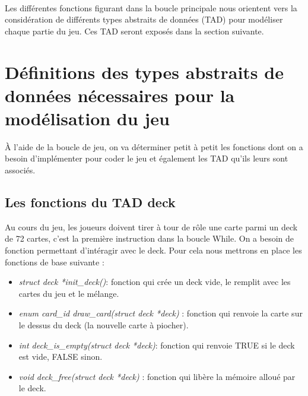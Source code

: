 \documentclass[12pt]{article}
\begin{document}
\paragraph{}Les différentes fonctions figurant dans la boucle principale nous orientent vers la considération de différents types abstraits de données (TAD) pour modéliser chaque partie du jeu. Ces TAD seront exposés dans la section suivante.

\section{Définitions des types abstraits de données nécessaires pour la modélisation du jeu}

À l'aide de la boucle de jeu, on va déterminer petit à petit les fonctions dont on a besoin d'implémenter pour coder le jeu et également les TAD qu'ils leurs sont associés.

\newsavebox{\fmbox}
\newenvironment{fmpage}[1]
     {\begin{lrbox}{\fmbox}\begin{minipage}{#1}}
     {\end{minipage}\end{lrbox}\shabox{\usebox{\fmbox}}}
     
\subsection{Les fonctions du TAD deck} 
Au cours du jeu, les joueurs doivent tirer à tour de rôle une carte parmi un deck de 72 cartes, c'est la première instruction dans la boucle While. On a besoin de fonction permettant d'intéragir avec le deck. Pour cela nous mettrons en place les fonctions de base suivante :

\begin{itemize}
\item \textit{struct deck *init\_deck()}: fonction qui crée un deck vide, le remplit  avec les cartes du jeu et le mélange.\\
\item \textit{enum card\_id  draw\_card(struct deck *deck)} : fonction qui renvoie la carte sur le dessus du deck (la nouvelle carte à piocher).\\
\item \textit{int deck\_is\_empty(struct deck *deck)}: fonction qui renvoie TRUE si le deck est vide, FALSE sinon.\\
\item \textit{void deck\_free(struct deck *deck)} : fonction qui libère la mémoire alloué par le deck.\\

\end{itemize}
\end{document}
